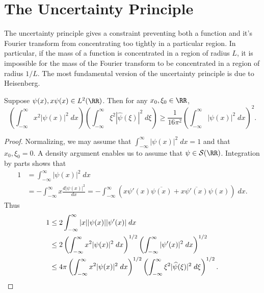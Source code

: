 \section{The Uncertainty Principle}

The uncertainty principle gives a constraint preventing both a function and it's Fourier transform from concentrating too tightly in a particular region. In particular, if the mass of a function is concentrated in a region of radius $L$, it is impossible for the mass of the Fourier transform to be concentrated in a region of radius $1/L$. The most fundamental version of the uncertainty principle is due to Heisenberg.

\begin{theorem}[Heisenberg]
    Suppose $\psi(x), x\psi(x) \in L^2(\RR)$. Then for any $x_0,\xi_0 \in \RR$,
    \[ \left( \int_{-\infty}^\infty x^2 |\psi(x)|^2\; dx \right) \left( \int_{-\infty}^\infty \xi^2 |\widehat{\psi}(\xi)|^2\; d\xi \right) \geq \frac{1}{16 \pi^2} \left( \int_{-\infty}^\infty |\psi(x)|^2\; dx \right)^2. \]
\end{theorem}
\begin{proof}
    Normalizing, we may assume that $\int_{-\infty}^\infty |\psi(x)|^2\; dx = 1$ and that $x_0,\xi_0 = 0$. A density argument enables us to assume that $\psi \in \mathcal{S}(\RR)$. Integration by parts shows that
    \begin{align*}
        1 &= \int_{-\infty}^\infty |\psi(x)|^2\; dx\\
        &= - \int_{-\infty}^\infty x \frac{d|\psi(x)|^2}{dx} = - \int_{-\infty}^\infty (x \psi'(x) \overline{\psi(x)} + x \overline{\psi'(x)} \psi(x))\; dx.
    \end{align*}
    Thus
    \begin{align*}
        1 &\leq 2 \int_{-\infty}^\infty |x| |\psi(x)| |\psi'(x)|\; dx\\
        &\leq 2 \left( \int_{-\infty}^\infty x^2 |\psi(x)|^2\; dx \right)^{1/2} \left( \int_{-\infty}^\infty |\psi'(x)|^2\; dx \right)^{1/2}\\
        &\leq 4 \pi \left( \int_{-\infty}^\infty x^2 |\psi(x)|^2\; dx \right)^{1/2} \left( \int_{-\infty}^\infty \xi^2 |\widehat{\psi}(\xi)|^2\; d\xi \right)^{1/2}. \qedhere
    \end{align*}
\end{proof}

